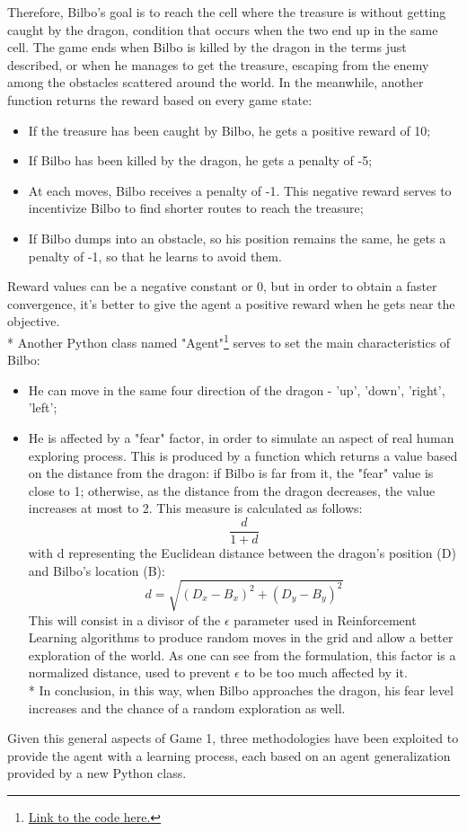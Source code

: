 Therefore, Bilbo's goal is to reach the cell where the treasure is without getting caught by the dragon, condition that occurs when the two end up in the same cell. The game ends when Bilbo is killed by the dragon in the terms just described, or when he manages to get the treasure, escaping from the enemy among the obstacles scattered around the world. In the meanwhile, another function returns the reward based on every game state:
\begin{itemize}
  \item If the treasure has been caught by Bilbo, he gets a positive reward of 10;
  \item If Bilbo has been killed by the dragon, he gets a penalty of -5;
  \item At each moves, Bilbo receives a penalty of -1. This negative reward serves to incentivize Bilbo to find shorter routes to reach the treasure;
  \item If Bilbo dumps into an obstacle, so his position remains the same, he gets a penalty of -1, so that he learns to avoid them.
\end{itemize}
Reward values can be a negative constant or 0, but in order to obtain a faster convergence, it's better to give the agent a positive reward when he gets near the objective.\\*
Another Python class named "Agent"\footnote{\href{https://github.com/moiraghif/DragonHunting/blob/master/Bilbo\%20World/agents.py}{Link to the code here.}} serves to set the main characteristics of Bilbo:
\begin{itemize}
  \item He can move in the same four direction of the dragon - 'up', 'down', 'right', 'left';
  \item He is affected by a "fear" factor, in order to simulate an aspect of real human exploring process. This is produced by a function which returns a value based on the distance from the dragon: if Bilbo is far from it, the "fear" value is close to 1; otherwise, as the distance from the dragon decreases, the value increases at most to 2. This measure is calculated as follows: 
  $$\frac{d}{1+d}$$
  with d representing the Euclidean distance between the dragon's position (D) and Bilbo's location (B):
  $$d=\sqrt{(D_{x}-B_{x})^2+(D_{y}-B_{y})^2}$$
  This will consist in a divisor of the $\epsilon$ parameter used in Reinforcement Learning algorithms to produce random moves in the grid and allow a better exploration of the world. As one can see from the formulation, this factor is a normalized distance, used to prevent $\epsilon$ to be too much affected by it.\\*
  In conclusion, in this way, when Bilbo approaches the dragon, his fear level increases and the chance of a random exploration as well.
\end{itemize}
Given this general aspects of Game 1, three methodologies have been exploited to provide the agent with a learning process, each based on an agent generalization provided by a new Python class.

